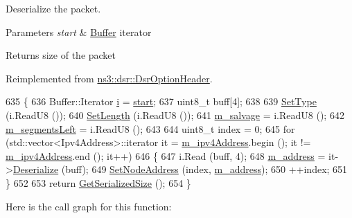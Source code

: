 Deserialize the packet. 


\begin{DoxyParams}{Parameters}
{\em start} & \hyperlink{classns3_1_1Buffer}{Buffer} iterator \\
\hline
\end{DoxyParams}
\begin{DoxyReturn}{Returns}
size of the packet 
\end{DoxyReturn}


Reimplemented from \hyperlink{classns3_1_1dsr_1_1DsrOptionHeader_ab44c93c37011591950bb95730c1c5b06}{ns3\+::dsr\+::\+Dsr\+Option\+Header}.


\begin{DoxyCode}
635 \{
636   Buffer::Iterator \hyperlink{bernuolliDistribution_8m_a6f6ccfcf58b31cb6412107d9d5281426}{i} = \hyperlink{namespacevisualizer_1_1core_a2a35e5d8a34af358b508dac8635754e0}{start};
637   uint8\_t buff[4];
638 
639   \hyperlink{classns3_1_1dsr_1_1DsrOptionHeader_a62b3733f99509fd870ff3ebc9d4513e4}{SetType} (i.ReadU8 ());
640   \hyperlink{classns3_1_1dsr_1_1DsrOptionHeader_ac13ae881ef80b4c2fce6d59f8aa0fa3e}{SetLength} (i.ReadU8 ());
641   \hyperlink{classns3_1_1dsr_1_1DsrOptionSRHeader_ad9251524491adff7f9f61244adcbe332}{m\_salvage} = i.ReadU8 ();
642   \hyperlink{classns3_1_1dsr_1_1DsrOptionSRHeader_a269e71e0fe2de16bcafffec1569b91eb}{m\_segmentsLeft} = i.ReadU8 ();
643 
644   uint8\_t index = 0;
645   \textcolor{keywordflow}{for} (std::vector<Ipv4Address>::iterator it = \hyperlink{classns3_1_1dsr_1_1DsrOptionSRHeader_a7ae74f398b5a6ba5559532ba3278a7bb}{m\_ipv4Address}.begin (); it != 
      \hyperlink{classns3_1_1dsr_1_1DsrOptionSRHeader_a7ae74f398b5a6ba5559532ba3278a7bb}{m\_ipv4Address}.end (); it++)
646     \{
647       i.Read (buff, 4);
648       \hyperlink{classns3_1_1dsr_1_1DsrOptionSRHeader_a52c1fc30837c6518274a5bbd8d9a252b}{m\_address} = it->\hyperlink{classns3_1_1Ipv4Address_ac6e205258d95465ce51c148e51590760}{Deserialize} (buff);
649       \hyperlink{classns3_1_1dsr_1_1DsrOptionSRHeader_aa8208507a825039423017c2bb3e9a3d5}{SetNodeAddress} (index, \hyperlink{classns3_1_1dsr_1_1DsrOptionSRHeader_a52c1fc30837c6518274a5bbd8d9a252b}{m\_address});
650       ++index;
651     \}
652 
653   \textcolor{keywordflow}{return} \hyperlink{classns3_1_1dsr_1_1DsrOptionSRHeader_a99d921d074f203984b6c21f1553041d7}{GetSerializedSize} ();
654 \}
\end{DoxyCode}


Here is the call graph for this function\+:


